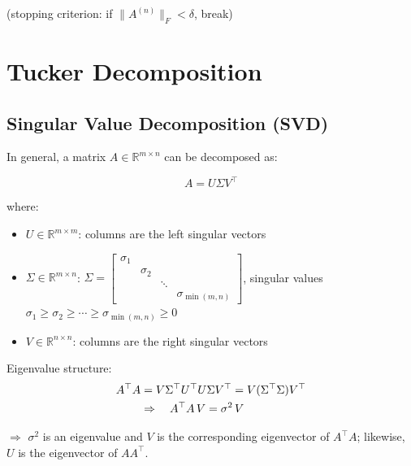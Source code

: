 \documentclass[12pt]{article}
\begin{document}
\medskip
\noindent (stopping criterion: if $\|A^{(n)}\|_F < \delta$, break)

\newpage
\section{Tucker Decomposition}

\subsection{Singular Value Decomposition (SVD)}

In general, a matrix $A \in \mathbb{R}^{m \times n}$ can be decomposed as:

\begin{equation}
A = U \Sigma V^{\top}
\end{equation}

where:
\begin{itemize}[itemsep=2pt]
  \item $U \in \mathbb{R}^{m \times m}$: columns are the left singular vectors
  \item $\Sigma \in \mathbb{R}^{m \times n}$:
        $\Sigma = \begin{bmatrix}
          \sigma_1 & & & \\
          & \sigma_2 & & \\
          & & \ddots & \\
          & & & \sigma_{\min(m,n)}
        \end{bmatrix}$,\quad
        singular values $\sigma_1 \geq \sigma_2 \geq \cdots \geq \sigma_{\min(m,n)} \geq 0$
  \item $V \in \mathbb{R}^{n \times n}$: columns are the right singular vectors
\end{itemize}

\medskip
\noindent Eigenvalue structure:
\begin{align}
A^{\top}A
&= V\Sigma^{\top}U^{\top} U\Sigma V^{\top}
 = V(\Sigma^{\top}\Sigma)V^{\top} \notag\\
&\Rightarrow\quad A^{\top}A\, V = \sigma^{2}\, V
\end{align}

$\Rightarrow$ $\sigma^2$ is an eigenvalue and $V$ is the corresponding eigenvector of $A^{\top}A$;
likewise, $U$ is the eigenvector of $AA^{\top}$.
\end{document}
